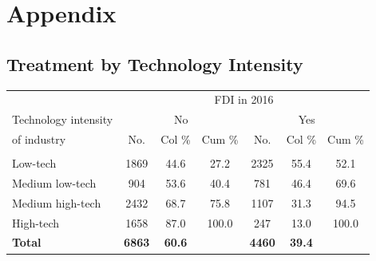 \documentclass[a4paper,11pt]{scrartcl}
\newcommand{\sectionnumbering}[1]{%
  \setcounter{section}{0}%
   \renewcommand{\thesection}{\csname #1\endcsname{section}}}
\begin{document}
\sectionnumbering{Roman}
\setcounter{page}{3} %

\appendix
\section{Appendix}

\subsection{Treatment by Technology Intensity}
\label{app:tech}
\begin{table}[htbp]
	\centering
\begin{threeparttable}

\begin{tabular}{lcccccc} 
\hline
\hline
 & \multicolumn{6}{c}{FDI in 2016} \\
Technology intensity & \multicolumn{3}{c}{No} & \multicolumn{3}{c}{Yes} \\
of industry &No.&Col \% &Cum \% &No.&Col \% &Cum \% \\
\hline
	&  &  &  &  &  &   \\
Low-tech &1869&44.6&27.2&2325&55.4&52.1 \\
Medium low-tech &904&53.6&40.4&781&46.4&69.6 \\
Medium high-tech &2432&68.7&75.8&1107&31.3&94.5 \\
High-tech &1658&87.0&100.0&247&13.0&100.0 \\
\textbf{Total}&\textbf{6863}&\textbf{60.6}&&\textbf{4460}&\textbf{39.4}& \\
\hline
\hline
\end{tabular}

\end{threeparttable}
\end{table}
\end{document}
